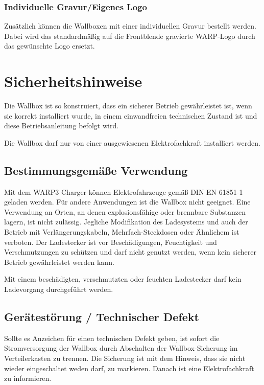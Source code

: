 \documentclass[a4paper,10pt]{article}
\newcommand{\hint}[1]{\begin{tcolorbox}[colback=boxgray,colframe=black,coltext=
white,title=Hinweis,left*=2mm,right*=2mm,boxsep=1mm,bottom=1mm,top=1mm]#1\end{tcolorbox}}
\begin{document}
\begin{multicols*}{2}
	\subsubsection*{Individuelle Gravur/Eigenes Logo}
	Zusätzlich können die Wallboxen mit einer individuellen Gravur bestellt
	werden. Dabei wird das standardmäßig auf die Frontblende gravierte WARP-Logo
	durch das gewünschte Logo ersetzt.


    \newpage
    \section{Sicherheitshinweise}
    Die Wallbox ist so konstruiert, dass ein sicherer Betrieb gewährleistet ist,
    wenn sie korrekt installiert wurde, in einem einwandfreien technischen Zustand
    ist und diese Betriebsanleitung befolgt wird. \hint{Die Wallbox darf nur von einer ausgewiesenen Elektrofachkraft installiert
        werden.}

    \subsection{Bestimmungsgemäße Verwendung}
    Mit dem WARP3 Charger können Elektrofahrzeuge gemäß DIN EN 61851-1 geladen
    werden. Für andere Anwendungen ist die Wallbox nicht geeignet. Eine Verwendung
    an Orten, an denen explosionsfähige oder brennbare Substanzen lagern, ist nicht
    zulässig. Jegliche Modifikation des Ladesystems und auch der Betrieb mit
    Verlängerungskabeln, Mehrfach-Steckdosen oder Ähnlichem ist verboten. Der
    Ladestecker ist vor Beschädigungen, Feuchtigkeit und Verschmutzungen zu
    schützen und darf nicht genutzt werden, wenn kein sicherer Betrieb
    gewährleistet werden kann. \hint{Mit einem beschädigten, verschmutzten oder feuchten Ladestecker darf kein Ladevorgang durchgeführt
        werden.}

    \subsection{Gerätestörung / Technischer Defekt}
    Sollte es Anzeichen für einen technischen Defekt geben, ist sofort die
    Stromversorgung der Wallbox durch Abschalten der Wallbox-Sicherung im Verteilerkasten zu trennen.
    Die Sicherung ist mit dem Hinweis, dass sie nicht wieder eingeschaltet weden darf, zu markieren.
    Danach ist eine Elektrofachkraft zu informieren.


\end{multicols*}
\end{document}
